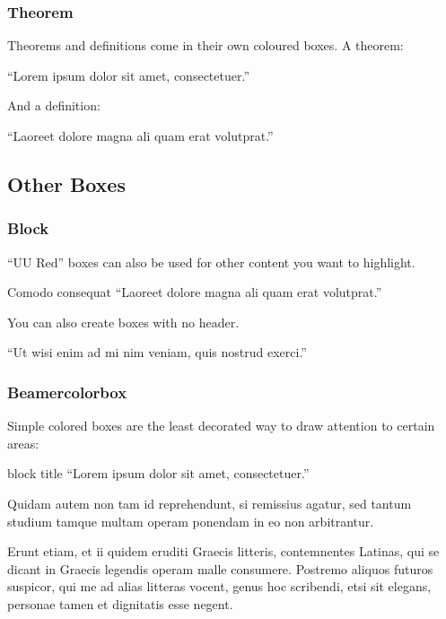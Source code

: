 \documentclass{beamer}
\begin{document}
\begin{frame}
  \frametitle{Theorem}

  Theorems and definitions come in their own coloured boxes. A theorem:

  \begin{theorem}
    ``Lorem ipsum dolor sit amet, consectetuer.''
  \end{theorem}

  And a definition:

  \begin{definition}
    ``Laoreet dolore magna ali quam erat volutprat.''
  \end{definition}

\end{frame}


\subsection{Other Boxes}

\begin{frame}
  \frametitle{Block}

  ``UU Red'' boxes can also be used for other content you want to highlight.

  \begin{block}{Comodo consequat}
    ``Laoreet dolore magna ali quam erat volutprat.''
  \end{block}

  You can also create boxes with no header.

  \begin{block}{}
    ``Ut wisi enim ad mi nim veniam, quis nostrud exerci.''
  \end{block}

\end{frame}

\begin{frame}
  \frametitle{Beamercolorbox}

  Simple colored boxes are the least decorated way to draw attention to certain areas:\newline

  \begin{beamercolorbox}[sep=0.5em]{block title}
    ``Lorem ipsum dolor sit amet, consectetuer.''
  \end{beamercolorbox}

  \vspace*{.5cm}

  Quidam autem non tam id reprehendunt, si remissius agatur, sed tantum studium
  tamque multam operam ponendam in eo non arbitrantur.

  Erunt etiam, et ii quidem eruditi Graecis litteris, contemnentes Latinas, qui
  se dicant in Graecis legendis operam malle consumere. Postremo aliquos futuros
  suspicor, qui me ad alias litteras vocent, genus hoc scribendi, etsi sit
  elegans, personae tamen et dignitatis esse negent.

\end{frame}
\end{document}
